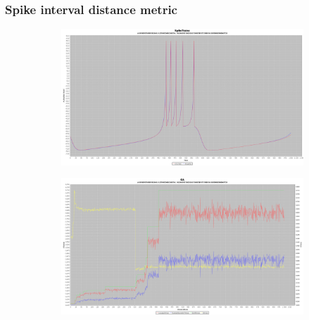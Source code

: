 \documentclass[10pt]{article}
\begin{document}
		\subsubsection{Spike interval distance metric}
			\begin{figure}[H]
				\centering
					\begin{subfigure}{.5\textwidth}
						\centering
						\includegraphics[width=\linewidth]{./../images/izzy1/interval/plot.png}
						
						\label{fig:sub2a}
					\end{subfigure}%
					\begin{subfigure}{.5\textwidth}
						\centering
						\includegraphics[width=\linewidth]{./../images/izzy1/interval/prog.png}
						
						\label{fig:sub2b}
					\end{subfigure}
					
					\label{fig:plot2}
			\end{figure}
		
\end{document}
